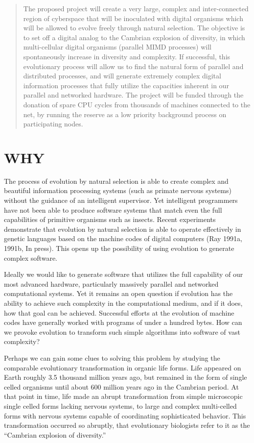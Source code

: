 \begin{abstract}
The proposed project will create a very large, complex and inter-connected
region of cyberspace that will be inoculated with digital organisms which
will be allowed to evolve freely through natural selection.  The objective
is to set off a digital analog to the Cambrian explosion of diversity, in
which multi-cellular digital organisms (parallel MIMD processes) will
spontaneously increase in diversity and complexity.  If successful, this
evolutionary process will allow us to find the natural form of parallel
and distributed processes, and will generate extremely complex digital
information processes that fully utilize the capacities inherent in our
parallel and networked hardware.  The project will be funded through the
donation of spare CPU cycles from thousands of machines connected to the
net, by running the reserve as a low priority background process on
participating nodes.
\end{abstract}

\section{\bf WHY}

The process of evolution by natural selection is able to create
complex and beautiful information processing systems (such as primate
nervous systems) without the guidance of an intelligent supervisor.
Yet intelligent programmers have not been able to produce software
systems that match even the full capabilities of primitive organisms such
as insects.  Recent experiments demonstrate that evolution by natural
selection is able to operate effectively in genetic languages based on
the machine codes of digital computers (Ray 1991a, 1991b, In press).
This opens up the possibility of using evolution to generate complex
software.

Ideally we would like to generate software that utilizes the full
capability of our most advanced hardware, particularly massively
parallel and networked computational systems.  Yet it remains an open
question if evolution has the ability to achieve such complexity in
the computational medium, and if it does, how that goal can be achieved.
Successful efforts at the evolution of machine codes have generally
worked with programs of under a hundred bytes.  How can we provoke
evolution to transform such simple algorithms into software of vast
complexity?

Perhaps we can gain some clues to solving this problem by studying the
comparable evolutionary transformation in organic life forms.  Life
appeared on Earth roughly 3.5 thousand million years ago, but remained
in the form of single celled organisms until about 600 million years
ago in the Cambrian period.  At that point in time, life made an abrupt
transformation from simple microscopic single celled forms lacking
nervous systems, to large and complex multi-celled forms with nervous
systems capable of coordinating sophisticated behavior.  This
transformation occurred so abruptly, that evolutionary biologists refer
to it as the ``Cambrian explosion of diversity.''

